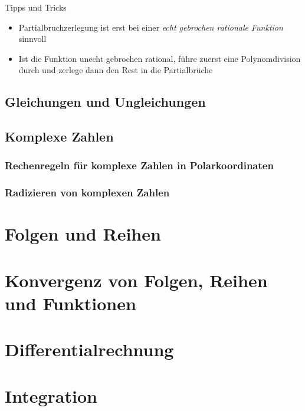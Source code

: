 \documentclass[german]{spicker}
\begin{document}
\begin{bonus}{Tipps und Tricks}
    \begin{itemize}
        \item Partialbruchzerlegung ist erst bei einer \emph{echt gebrochen rationale Funktion} sinnvoll
        \item Ist die Funktion unecht gebrochen rational, führe zuerst eine Polynomdivision durch und zerlege dann den Rest in die Partialbrüche
    \end{itemize}
\end{bonus}

\subsection{Gleichungen und Ungleichungen}

\subsection{Komplexe Zahlen}
\subsubsection{Rechenregeln für komplexe Zahlen in Polarkoordinaten}

\subsubsection{Radizieren von komplexen Zahlen}

\section{Folgen und Reihen}

\section{Konvergenz von Folgen, Reihen und Funktionen}

\section{Differentialrechnung}

\section{Integration}
\end{document}
